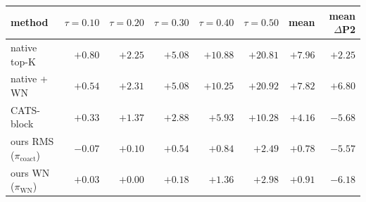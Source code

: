 \setlength{\tabcolsep}{4pt}
\begin{tabular}{lrrrrrrr}
\toprule
method & $\tau{=}0.10$ & $\tau{=}0.20$ & $\tau{=}0.30$ & $\tau{=}0.40$ & $\tau{=}0.50$ & mean & mean $\Delta$P2 \\
\midrule
native top-K & $+0.80$ & $+2.25$ & $+5.08$ & $+10.88$ & $+20.81$ & $+7.96$ & $+2.25$ \\
native + WN & $+0.54$ & $+2.31$ & $+5.08$ & $+10.25$ & $+20.92$ & $+7.82$ & $+6.80$ \\
CATS-block & $+0.33$ & $+1.37$ & $+2.88$ & $+5.93$ & $+10.28$ & $+4.16$ & $-5.68$ \\
ours RMS ($\pi_{\mathrm{coact}}$) & $\mathbf{-0.07}$ & $+0.10$ & $+0.54$ & $\mathbf{+0.84}$ & $\mathbf{+2.49}$ & $+0.78$ & $-5.57$ \\
ours WN ($\pi_{\mathrm{WN}}$) & $+0.03$ & $\mathbf{+0.00}$ & $\mathbf{+0.18}$ & $+1.36$ & $+2.98$ & $+0.91$ & $-6.18$ \\
\bottomrule
\end{tabular}
